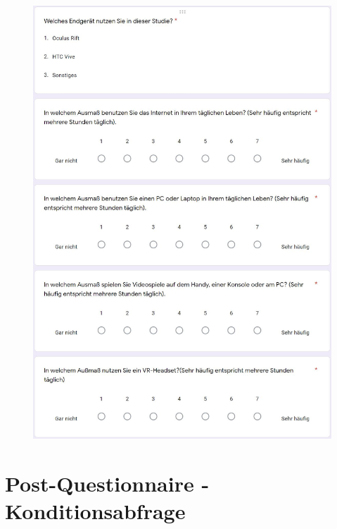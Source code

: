 \documentclass[a4paper,11pt]{article}%
\renewcommand{\\}{\vspace*{0.5\baselineskip} \newline}
\begin{document}
	\begin{figure}[H]
		\begin{footnotesize}
			\includegraphics[width=\textwidth]{Abbildungen/Fragebogen/Pre-Questionnaire/PQ6}\\
		\end{footnotesize}
	\end{figure}	
	
\section{Post-Questionnaire - Konditionsabfrage}
\label{Post-Questionnaire - Konditionsabfrage}
\end{document}
